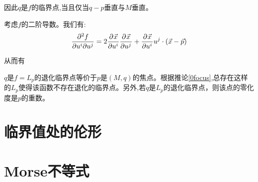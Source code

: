 因此$q$是$f$的临界点,当且仅当$q-p$垂直与$M$垂直。

考虑$f$的二阶导数。我们有:
\begin{align*}
	\frac{\partial^2 f}{\partial u^i\partial u^j}=2\frac{\partial^{} \vec{x}}{\partial {u^i}^{}}\frac{\partial^{} \vec{x}}{\partial {u^j}^{}}+\frac{\partial^{} \vec{x}}{\partial {u^i}^{}}u^j\cdot(\vec{x}-\vec{p})
\end{align*}

从而有
\begin{lemma}
	$q$是$f=L_p$的退化临界点等价于$p$是$(M,q)$的焦点。根据推论\ref{0focus},总存在这样的$L_p$使得该函数不存在退化的临界点。另外,若$q$是$L_p$的退化临界点，则该点的零化度是$p$的重数。
\end{lemma}

\section{临界值处的伦形}
\section{Morse不等式}
\ifx\allfiles\undefined
	
	
	
	
	\else
	\fi